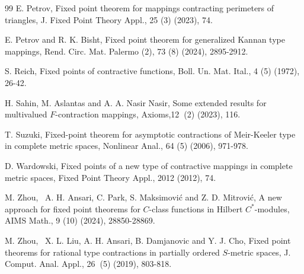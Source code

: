 \documentclass[reqno,11pt]{amsart}
\theoremstyle{plain}
\numberwithin{equation}{section}
\begin{document}
\begin{thebibliography}{99}
 E. Petrov, Fixed point theorem for mappings contracting
perimeters of triangles, J. Fixed Point Theory Appl., 25 (3) (2023), 74.

 E. Petrov and R. K. Bisht, Fixed point theorem for generalized
Kannan type mappings, Rend. Circ. Mat. Palermo (2), 73 (8) (2024), 2895-2912.

 S. Reich, Fixed points of contractive functions, Boll. Un. Mat.
Ital., 4 (5) (1972), 26-42.

 H. Sahin, M. Aslantas and A. A. Nasir Nasir, Some extended
results for multivalued $F$-contraction mappings, Axioms,12\textbf{\ }(2)
(2023), 116.

 T. Suzuki, Fixed-point theorem for asymptotic contractions of
Meir-Keeler type in complete metric spaces, Nonlinear Anal., 64 (5) (2006),
971-978.

 D. Wardowski, Fixed points of a new type of contractive
mappings in complete metric spaces, Fixed Point Theory Appl., 2012 (2012),
74.

 M. Zhou, \ A. H. Ansari, C. Park, S. Maksimovi\'{c} and Z. D.
Mitrovi\'{c}, A new approach for fixed point theorems for $C$-class
functions in Hilbert $C^{\ast }$-modules, AIMS Math., 9 (10) (2024),
28850-28869.

 M. Zhou, \ X. L. Liu, A. H. Ansari, B. Damjanovic and Y. J.
Cho, Fixed point theorems for rational type contractions in partially
ordered $S$-metric spaces, J. Comput. Anal. Appl., 26\textbf{\ }(5) (2019),
803-818.
\end{thebibliography}
\end{document}

